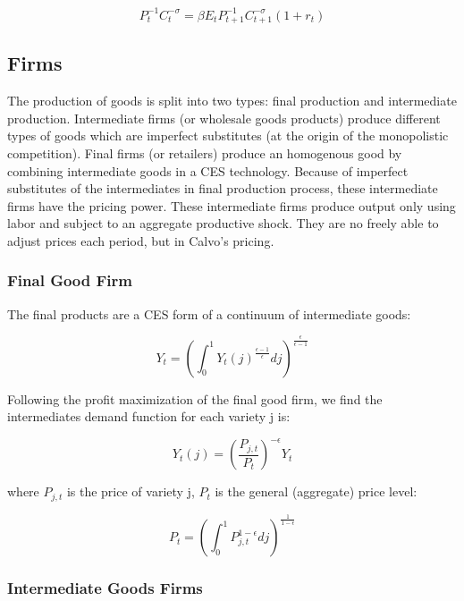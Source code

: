 \documentclass[10pt,math=newtx,citestyle=gb7714-2015,bibstyle=gb7714-2015]{elegantbook}
\begin{document}
{	\begin{equation}
		P_t^{-1}C_t^{-\sigma}=\beta E_tP_{t+1}^{-1}C_{t+1}^{-\sigma}(1+r_t)
	\end{equation}
	
	
	\subsection{Firms}
	
	The production of goods is split into two types: final production and intermediate production. Intermediate firms (or wholesale goods products) produce different types of goods which are imperfect substitutes (at the origin of the monopolistic competition). Final firms (or retailers) produce an homogenous good by combining intermediate goods in a CES technology. Because of imperfect substitutes of the intermediates in final production process, these intermediate firms have the pricing power. These intermediate firms produce output only using labor and subject to an aggregate productive shock. They are no freely able to adjust prices each period, but in Calvo's pricing.
	
	\subsubsection{Final Good Firm}
	
	The final products are a CES form of a continuum of intermediate goods:
	
	\begin{equation}
		Y_t=\left(\int_0^1Y_t(j)^{\frac{\epsilon-1}{\epsilon}}dj \right)^{\frac{\epsilon}{\epsilon-1}}
	\end{equation}
	
	Following the profit maximization of the final good firm, we find the intermediates demand function for each variety j is:
	
	\begin{equation}
		Y_t(j)=\left(\frac{P_{j,t}}{P_t}\right)^{-\epsilon}Y_t
	\end{equation}
	
	where $P_{j,t}$ is the price of variety j, $P_t$ is the general (aggregate) price level:
	
	\begin{equation}
		P_t=\left(\int_0^1P_{j,t}^{1-\epsilon}dj\right)^{\frac{1}{1-\epsilon}}
	\end{equation}
	
	\subsubsection{Intermediate Goods Firms}
	
}
\end{document}
